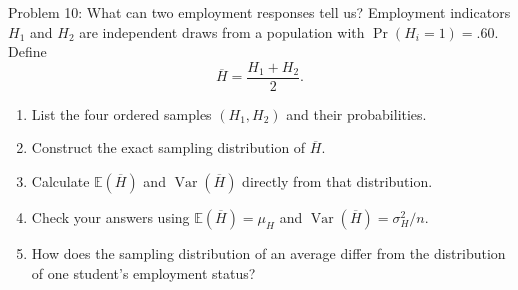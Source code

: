 \documentclass[notes,10pt, aspectratio=169]{beamer}
\newcommand{\E}{\mathbb{E}}
\newcommand{\Var}{\operatorname{Var}}
\begin{document}
\begin{frame}{Problem 10: What can two employment responses tell us?}
Employment indicators $H_1$ and $H_2$ are independent draws from a population with $\Pr(H_i=1)=.60$. Define
\[
\overline H=\frac{H_1+H_2}{2}.
\]
\begin{enumerate}
\setlength{\itemsep}{8pt}
\item List the four ordered samples $(H_1,H_2)$ and their probabilities.
\item Construct the exact sampling distribution of $\overline H$.
\item Calculate $\E(\overline H)$ and $\Var(\overline H)$ directly from that distribution.
\item Check your answers using $\E(\overline H)=\mu_H$ and $\Var(\overline H)=\sigma_H^2/n$.
\item How does the sampling distribution of an average differ from the distribution of one student's employment status?
\end{enumerate}
\end{frame}
\end{document}

